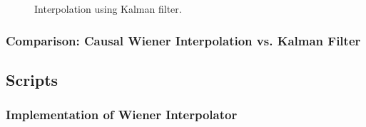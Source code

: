 \documentclass[11pt]{article}
\begin{document}
\begin{figure}[t]
\centering
{}
\caption{Interpolation using Kalman filter.}
\label{fig:kalman}
\end{figure}


\subsubsection*{Comparison: Causal Wiener Interpolation vs. Kalman Filter}
\label{subsubsec:comparison}



\appendix

\subsection*{Scripts}


\subsubsection*{Implementation of Wiener Interpolator}
\end{document}
